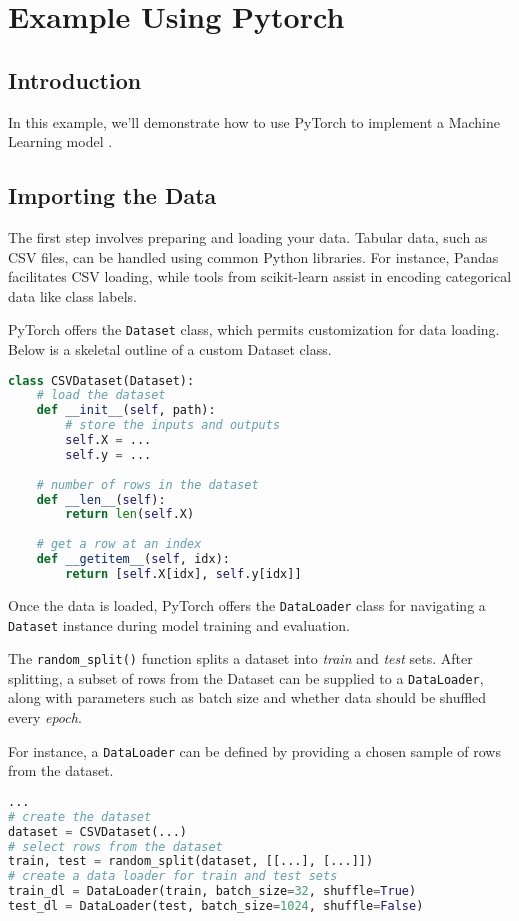 \section{Example Using Pytorch} 
 \subsection{Introduction}%
  \label{sub:Introduction}
  
In this example, we'll demonstrate how to use PyTorch to implement a Machine Learning model \citep{brownlee_2023}.

\subsection{Importing the Data}
The first step involves preparing and loading your data. Tabular data, such as CSV files, can be handled using common Python libraries. For instance, Pandas facilitates CSV loading, while tools from scikit-learn assist in encoding categorical data like class labels.

PyTorch offers the \texttt{Dataset} class, which permits customization for data loading. Below is a skeletal outline of a custom Dataset class.

\begin{lstlisting}[language=Python, caption=Python code for a PyTorch Dataset class]
class CSVDataset(Dataset):
    # load the dataset
    def __init__(self, path):
        # store the inputs and outputs
        self.X = ...
        self.y = ...
 
    # number of rows in the dataset
    def __len__(self):
        return len(self.X)
 
    # get a row at an index
    def __getitem__(self, idx):
        return [self.X[idx], self.y[idx]]
\end{lstlisting}
Once the data is loaded, PyTorch offers the \texttt{DataLoader} class for navigating a \texttt{Dataset} instance during model training and evaluation. 

The \texttt{random\_split()} function splits a dataset into \textit{train} and \textit{test} sets. After splitting, a subset of rows from the Dataset can be supplied to a \texttt{DataLoader}, along with parameters such as batch size and whether data should be shuffled every \textit{epoch}.

For instance, a \texttt{DataLoader} can be defined by providing a chosen sample of rows from the dataset.
\begin{lstlisting}[language=Python, caption=Python code for creating a DataLoader instance]
...
# create the dataset
dataset = CSVDataset(...)
# select rows from the dataset
train, test = random_split(dataset, [[...], [...]])
# create a data loader for train and test sets
train_dl = DataLoader(train, batch_size=32, shuffle=True)
test_dl = DataLoader(test, batch_size=1024, shuffle=False)
\end{lstlisting}
